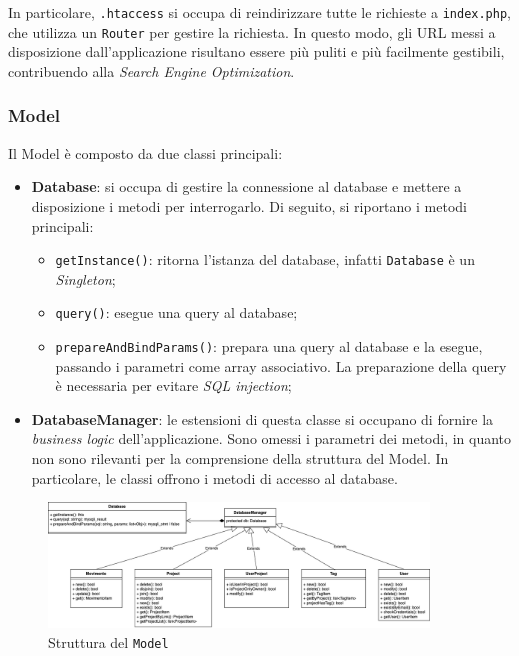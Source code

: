 In particolare, \texttt{.htaccess} si occupa di reindirizzare tutte le richieste
a \texttt{index.php}, che utilizza un \texttt{Router} per gestire la richiesta.
In questo modo, gli URL messi a disposizione dall'applicazione risultano essere
più puliti e più facilmente gestibili, contribuendo alla \textit{Search Engine
Optimization}.

\subsubsection{Model}

Il Model è composto da due classi principali:
\begin{itemize}
	\item \textbf{Database}: si occupa di gestire la connessione al database e
		mettere a disposizione i metodi per interrogarlo. Di seguito, si 
		riportano i metodi principali:

		\begin{itemize}
			\item \texttt{getInstance()}: ritorna l'istanza del database,
				infatti \texttt{Database} è un \textit{Singleton};

			\item \texttt{query()}: esegue una query al database;

			\item \texttt{prepareAndBindParams()}: prepara una query al database
				e la esegue, passando i parametri come array associativo. La
				preparazione della query è necessaria per evitare \textit{SQL
				injection};
	\end{itemize}

	\item \textbf{DatabaseManager}: le estensioni di questa classe si occupano
		di fornire la \textit{business logic} dell'applicazione. Sono omessi i
		parametri dei metodi, in quanto non sono rilevanti per la comprensione
		della struttura del Model. In particolare, le classi offrono i metodi di
		accesso al database.
\end{itemize}

\begin{figure}[H]
	\centering
	\includegraphics[width=0.9\textwidth]{figures/ModelClassDiagram.png}
	\caption{Struttura del \texttt{Model}}
\end{figure}

